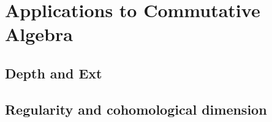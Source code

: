 \section{Applications to Commutative Algebra}

\subsection{Depth and Ext}

\subsection{Regularity and cohomological dimension}